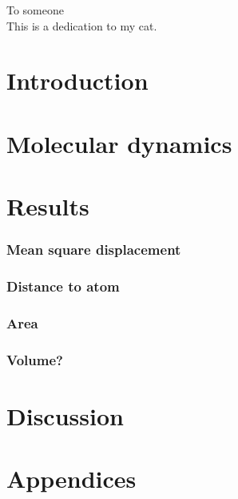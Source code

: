 \documentclass[twoside,english,a4paper]{uiofysmaster}
\begin{document}

\cleardoublepage

\begin{abstract}
\lipsum
\end{abstract}

\begin{dedication}
  To someone
  \\\vspace{12pt}
  This is a dedication to my cat.
\end{dedication}

\begin{acknowledgements}
  \lipsum
\end{acknowledgements}

\tableofcontents

\listoffigures
\listoftables
\listoflistings

\part{Introduction}


\part{Molecular dynamics}


\part{Results}
    \section{Mean square displacement}
    \section{Distance to atom}
    \section{Area}
    \section{Volume?}

\part{Discussion}

\part{Appendices}




\printbibliography
% 
\end{document}
